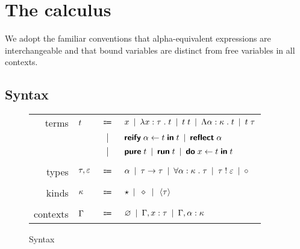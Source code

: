 \section{The calculus}

  We adopt the familiar conventions that alpha-equivalent expressions are interchangeable and that bound variables are distinct from free variables in all contexts.

  \subsection{Syntax}

    \begin{figure}[H]
      \begin{center}
        \begin{tabular}{r l c l}
          terms & \(t\) & \(\Coloneqq\) & \(
            x                                           \enspace | \enspace
            \lambda x : \tau \; . \; t                      \enspace | \enspace
            t \; t                             \enspace | \enspace
            \Lambda \alpha : \kappa \; . \; t                     \enspace | \enspace
            t \; \tau                            \) \\
          & & \(|\) & \(
            \textsf{\textbf{reify}} \; \alpha \leftarrow t \; \textsf{\textbf{in}} \; t                    \enspace | \enspace
            \textsf{\textbf{reflect}} \; \alpha                                \) \\
          & & \(|\) & \(
            \textsf{\textbf{pure}} \; t                                   \enspace | \enspace
            \textsf{\textbf{run}} \; t                                    \enspace | \enspace
            \textsf{\textbf{do}} \; x \leftarrow t \; \textsf{\textbf{in}} \; t                       \) \\ \\
          types & \(\tau, \varepsilon\) & \(\Coloneqq\) & \(
            \alpha                                           \enspace | \enspace
            \tau \rightarrow \tau                           \enspace | \enspace
            \forall \alpha : \kappa \; . \; \tau                   \enspace | \enspace
            \tau \; ! \; \varepsilon                   \enspace | \enspace
            \circ                                          \) \\ \\
          kinds & \(\kappa\) & \(\Coloneqq\) & \(
            \star                                          \enspace | \enspace
            \diamond                                        \enspace | \enspace
            \left\langle \tau \right\rangle                                \) \\ \\
          contexts & \(\Gamma\) & \(\Coloneqq\) & \(
            \varnothing                                         \enspace | \enspace
            \Gamma, x : \tau               \enspace | \enspace
            \Gamma, \alpha : \kappa               \)
        \end{tabular}
      \end{center}

      \caption{Syntax}
      \label{fig:syntax}
    \end{figure}

